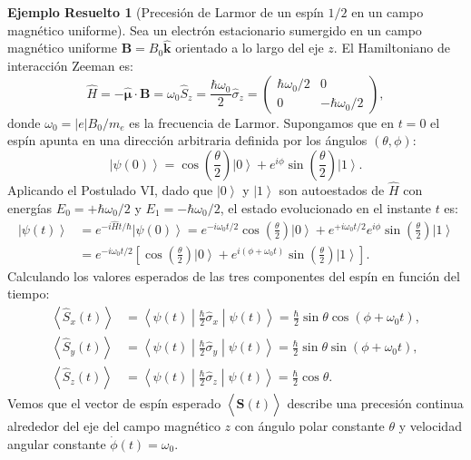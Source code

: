 \documentclass[11pt,a4paper,twoside]{report}
\theoremstyle{definition}
\newtheorem{ejemplo}{Ejemplo Resuelto}[chapter]
\theoremstyle{plain}
\theoremstyle{remark}
\newcommand{\ket}[1]{\left| #1 \right\rangle}
\newcommand{\mel}[3]{\left\langle #1 \middle| #2 \middle| #3 \right\rangle}
\newcommand{\expval}[1]{\left\langle #1 \right\rangle}
\newcommand{\op}[1]{\hat{#1}}
\begin{document}
\begin{ejemplo}[Precesión de Larmor de un espín $1/2$ en un campo magnético uniforme]
Sea un electrón estacionario sumergido en un campo magnético uniforme $\bm{B} = B_0 \bm{\hat{k}}$ orientado a lo largo del eje $z$. El Hamiltoniano de interacción Zeeman es:
\begin{equation}
    \op{H} = -\bm{\op{\mu}}\cdot \bm{B} = \omega_0 \op{S}_z = \frac{\hbar\omega_0}{2}\op{\sigma}_z = \begin{pmatrix} \hbar\omega_0/2 & 0 \\ 0 & -\hbar\omega_0/2 \end{pmatrix},
\end{equation}
donde $\omega_0 = |e|B_0/m_e$ es la frecuencia de Larmor. Supongamos que en $t = 0$ el espín apunta en una dirección arbitraria definida por los ángulos $(\theta, \phi)$:
\begin{equation}
    \ket{\psi(0)} = \cos\left(\frac{\theta}{2}\right)\ket{0} + e^{i\phi}\sin\left(\frac{\theta}{2}\right)\ket{1}.
\end{equation}
Aplicando el Postulado VI, dado que $\ket{0}$ y $\ket{1}$ son autoestados de $\op{H}$ con energías $E_0 = +\hbar\omega_0/2$ y $E_1 = -\hbar\omega_0/2$, el estado evolucionado en el instante $t$ es:
\begin{align}
    \ket{\psi(t)} &= e^{-i\op{H}t/\hbar}\ket{\psi(0)} = e^{-i\omega_0 t/2}\cos\left(\frac{\theta}{2}\right)\ket{0} + e^{+i\omega_0 t/2}e^{i\phi}\sin\left(\frac{\theta}{2}\right)\ket{1} \nonumber \\
    &= e^{-i\omega_0 t/2} \left[ \cos\left(\frac{\theta}{2}\right)\ket{0} + e^{i(\phi + \omega_0 t)}\sin\left(\frac{\theta}{2}\right)\ket{1} \right].
\end{align}
Calculando los valores esperados de las tres componentes del espín en función del tiempo:
\begin{align}
    \expval{\op{S}_x(t)} &= \mel{\psi(t)}{\frac{\hbar}{2}\op{\sigma}_x}{\psi(t)} = \frac{\hbar}{2}\sin\theta \cos(\phi + \omega_0 t), \\
    \expval{\op{S}_y(t)} &= \mel{\psi(t)}{\frac{\hbar}{2}\op{\sigma}_y}{\psi(t)} = \frac{\hbar}{2}\sin\theta \sin(\phi + \omega_0 t), \\
    \expval{\op{S}_z(t)} &= \mel{\psi(t)}{\frac{\hbar}{2}\op{\sigma}_z}{\psi(t)} = \frac{\hbar}{2}\cos\theta.
\end{align}
Vemos que el vector de espín esperado $\expval{\bm{\op{S}}(t)}$ describe una precesión continua alrededor del eje del campo magnético $z$ con ángulo polar constante $\theta$ y velocidad angular constante $\dot{\phi}(t) = \omega_0$.
\end{ejemplo}
\end{document}
